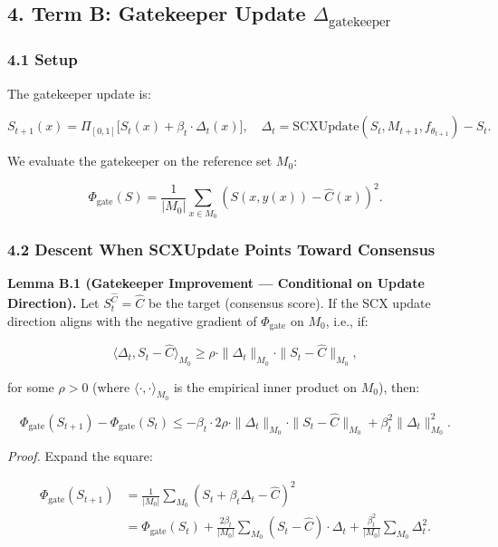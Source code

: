 \documentclass[
  12pt,
]{ctexart}
\begin{document}
\subsection{\texorpdfstring{4. Term B: Gatekeeper Update
\(\Delta_{\text{gatekeeper}}\)}{4. Term B: Gatekeeper Update \textbackslash Delta\_\{\textbackslash text\{gatekeeper\}\}}}\label{term-b-gatekeeper-update-delta_textgatekeeper}

\subsubsection{4.1 Setup}\label{setup-1}

The gatekeeper update is:

\[S_{t+1}(x) = \Pi_{[0,1]}\bigl[S_t(x) + \beta_t \cdot \Delta_t(x)\bigr], \quad \Delta_t = \text{SCXUpdate}(S_t, M_{t+1}, f_{\theta_{t+1}}) - S_t.\]

We evaluate the gatekeeper on the reference set \(M_0\):

\[\Phi_{\text{gate}}(S) = \frac{1}{|M_0|} \sum_{x \in M_0} (S(x, y(x)) - \hat{C}(x))^2.\]

\subsubsection{4.2 Descent When SCXUpdate Points Toward
Consensus}\label{descent-when-scxupdate-points-toward-consensus}

\textbf{Lemma B.1 (Gatekeeper Improvement --- Conditional on Update
Direction).} Let \(S_t^{\hat{C}} = \hat{C}\) be the target (consensus
score). If the SCX update direction aligns with the negative gradient of
\(\Phi_{\text{gate}}\) on \(M_0\), i.e., if:

\[\langle \Delta_t, S_t - \hat{C} \rangle_{M_0} \geq \rho \cdot \|\Delta_t\|_{M_0} \cdot \|S_t - \hat{C}\|_{M_0},\]

for some \(\rho > 0\) (where \(\langle \cdot, \cdot \rangle_{M_0}\) is
the empirical inner product on \(M_0\)), then:

\[\Phi_{\text{gate}}(S_{t+1}) - \Phi_{\text{gate}}(S_t) \leq -\beta_t \cdot 2\rho \cdot \|\Delta_t\|_{M_0} \cdot \|S_t - \hat{C}\|_{M_0} + \beta_t^2 \|\Delta_t\|_{M_0}^2.\]

\emph{Proof.} Expand the square:

\[\begin{aligned}
\Phi_{\text{gate}}(S_{t+1}) &= \frac{1}{|M_0|} \sum_{M_0} (S_t + \beta_t \Delta_t - \hat{C})^2 \\
&= \Phi_{\text{gate}}(S_t) + \frac{2\beta_t}{|M_0|} \sum_{M_0} (S_t - \hat{C}) \cdot \Delta_t + \frac{\beta_t^2}{|M_0|} \sum_{M_0} \Delta_t^2.
\end{aligned}\]
\end{document}
